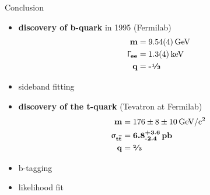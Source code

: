 \begin{frame}{Conclusion}

	\begin{itemize}
		\itemfill
		\item \textbf{discovery of b-quark} in 1995 (Fermilab)
		{\begin{align*}
			\z{\textbf{m}} 						&= \textbf{\SI{9.54\pm.04}{\giga\electronvolt}}\\
			\mathbf{\Upgamma}_{\z{\textbf{ee}}}	&= \textbf{\SI{1.3\pm.4}{\kilo\electronvolt}}\\
			\z{\textbf{q}}						&= \textbf{-\sfrac{1}{3}}
		\end{align*}}\vspace*{-10pt}
		\item sideband fitting
		\item \textbf{discovery of the t-quark} (Tevatron at Fermilab)
		{\begin{align*}
			\z{\textbf{m}} 						&= \textbf{\SI[parse-numbers=false]{176\pm8\pm10}{\giga\electronvolt\per c^2}}\\
				\mathbf{\upsigma}_{\z{\textbf{t}}\overline{\z{\textbf{t}}}} &= \textbf{6.8}^{\textbf{+3.6}}_{\textbf{-2.4}}\,\z{\textbf{pb}}\\
			\z{\textbf{q}}						&= \textbf{\sfrac{2}{3}}
		\end{align*}}\vspace*{-10pt}
		\item b-tagging
		\item likelihood fit
	\end{itemize}
	
\end{frame}

